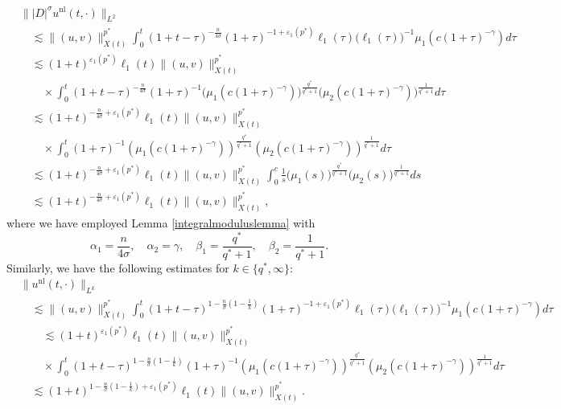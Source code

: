 \documentclass[11pt,reqno]{amsart}
\newcommand{\tron}[1]{\left( #1 \right)}
\numberwithin{equation}{section}
\begin{document}
\begin{align}
& \big\||D|^{\sigma}u^{\mathrm{nl}}(t, \cdot)\big\|_{L^2}\nonumber\\
&\quad \lesssim\|(u, v)\|_{X(t)}^{p^*} \int_0^t(1+t-\tau)^{-\frac{n}{4\sigma}}(1+\tau)^{-1+\varepsilon_1(p^*)} \ell_1(\tau)\big(\ell_1(\tau)\big)^{-1} \mu_1\left(c(1+\tau)^{-\gamma}\right) d \tau\nonumber\\
&\quad \lesssim(1+t)^{\varepsilon_1(p^*)} \ell_1(t)\|(u, v)\|_{X(t)}^{p^*} \nonumber\\
&\qquad \times \int_0^t(1+t-\tau)^{-\frac{n}{4\sigma}}(1+\tau)^{-1}\big(\mu_1\left(c(1+\tau)^{-\gamma}\right)\big)^{\frac{q^*}{q^*+1}}\big(\mu_2\left(c(1+\tau)^{-\gamma}\right)\big)^{\frac{1}{q^*+1}} d \tau\nonumber\\
&\quad\lesssim(1+t)^{-\frac{n}{4\sigma}+\varepsilon_1(p^*)}\ell_1(t)\|(u, v)\|_{X(t)}^{p^*}\nonumber\\
&\qquad \times\int_0^t(1+\tau)^{-1}\left(\mu_1\left(c(1+\tau)^{-\gamma}\right)\right)^{\frac{q^*}{q^*+1}}\left(\mu_2\left(c(1+\tau)^{-\gamma}\right)\right)^{\frac{1}{q^*+1}} d \tau\nonumber\\
&\quad\lesssim (1+t)^{-\frac{n}{4\sigma}+\varepsilon_1(p^*)} \ell_1(t)\|(u, v)\|_{X(t)}^{p^*} \int_0^c \frac{1}{s}\big(\mu_1(s)\big)^{\frac{q^*}{q^*+1}}\big(\mu_2(s)\big)^{\frac{1}{q^*+1}} ds\nonumber\\
&\quad\lesssim(1+t)^{-\frac{n}{4\sigma}+\varepsilon_1(p^*)}\ell_1(t)\|(u, v)\|_{X(t)}^{p^*},\label{eq14thr1.1}
\end{align}
where we have employed Lemma \ref{integralmoduluslemma} with
\[
\alpha_1 = \frac{n}{4\sigma}, \quad \alpha_2 = \gamma, \quad \beta_1 = \frac{q^*}{q^*+1}, \quad \beta_2 = \frac{1}{q^*+1}.
\]
Similarly, we have the following estimates for $k\in \{q^*,\infty\}$:
\begin{align}
&\big\|u^{\mathrm{nl}}(t, \cdot)\big\|_{L^k}\nonumber\\
&\quad \lesssim\|(u, v)\|_{X(t)}^{p^*} \int_0^t(1+t-\tau)^{1-\frac{n}{\sigma}\tron{1-\frac{1}{k}}}(1+\tau)^{-1+\varepsilon_1(p^*)} \ell_1(\tau)\big(\ell_1(\tau)\big)^{-1} \mu_1\left(c(1+\tau)^{-\gamma}\right) d \tau\nonumber\\
&\qquad \lesssim(1+t)^{\varepsilon_1(p^*)} \ell_1(t)\|(u, v)\|_{X(t)}^{p^*} \nonumber\\
&\qquad \times \int_0^t(1+t-\tau)^{1-\frac{n}{\sigma}\tron{1-\frac{1}{k}}}(1+\tau)^{-1}\left(\mu_1\left(c(1+\tau)^{-\gamma}\right)\right)^{\frac{q^*}{q^*+1}}\left(\mu_2\left(c(1+\tau)^{-\gamma}\right)\right)^{\frac{1}{q^*+1}} d \tau\nonumber\\
&\quad \lesssim(1+t)^{1-\frac{n}{\sigma}\tron{1-\frac{1}{k}}+\varepsilon_1(p^*)}\ell_1(t)\|(u, v)\|_{X(t)}^{p^*}.\label{eq15thr1.1}
\end{align}
\end{document}
